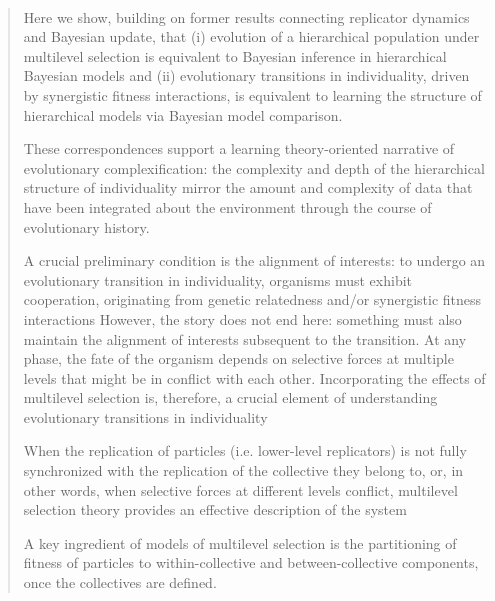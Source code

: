 \documentclass[a4paper,10pt]{article}
\begin{document}
\\

\begin{quotation} \cite{czegel2019-bayesianEvolution}

    Here we show, building on former results connecting replicator dynamics and Bayesian update, that (i) evolution of a hierarchical population under multilevel selection is equivalent to Bayesian inference in hierarchical Bayesian models and (ii) evolutionary transitions in individuality, driven by synergistic fitness interactions, is equivalent to learning the structure of hierarchical models via Bayesian model comparison.

    These correspondences support a learning theory-oriented narrative of evolutionary complexification: the complexity and depth of the hierarchical structure of individuality mirror the amount and complexity of data that have been integrated about the environment through the course of evolutionary history.
    
    A crucial preliminary condition is the alignment of interests: to undergo an evolutionary transition in individuality, organisms must exhibit cooperation, originating from genetic relatedness and/or synergistic fitness interactions
    However, the story does not end here: something must also maintain the alignment of interests subsequent to the transition.
    At any phase, the fate of the organism depends on selective forces at multiple levels that might be in conflict with each other.
    Incorporating the effects of multilevel selection is, therefore, a crucial element of understanding evolutionary transitions in individuality
    
    When the replication of particles (i.e. lower-level replicators) is not fully synchronized with the replication of the collective they belong to, or, in other words, when selective forces at different levels conflict, multilevel selection theory provides an effective description of the system
    
    A key ingredient of models of multilevel selection is the partitioning of fitness of particles to within-collective and between-collective components, once the collectives are defined.

    
\end{quotation}

\\
\end{document}
